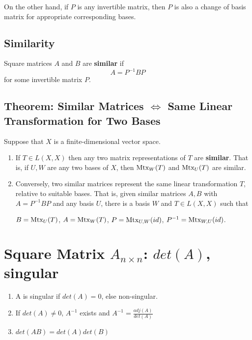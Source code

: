 \documentclass[11pt]{elegantbook}
\begin{document}
On the other hand, if $P$ is any invertible matrix, then $P$ is also a change of basis matrix for appropriate corresponding bases.

\subsection{Similarity}
\begin{definition}[Similar]
    \normalfont
    Square matrices $A$ and $B$ are \textbf{similar} if $$A=P^{-1}BP$$ for some invertible matrix $P$.
\end{definition}


\subsection{Theorem: Similar Matrices $\Leftrightarrow$ Same Linear Transformation for Two Bases}
\begin{theorem}
    Suppose that $X$ is a finite-dimensional vector space.
    \begin{enumerate}
        \item If $T \in L(X, X)$ then any two matrix representations of $T$ are \textbf{similar}. That is, if $U, W$ are any two bases of $X$, then $\textnormal{Mtx}_W(T)$ and $\textnormal{Mtx}_U(T)$ are similar.
        \item Conversely, two similar matrices represent the same linear transformation $T$, relative to suitable bases. That is, given similar matrices $A, B$ with $A = P^{-1}BP$ and any basis $U$, there is a basis $W$ and $T \in L(X, X)$ such that
        \begin{center}
            $B=\textnormal{Mtx}_U(T)$, $A=\textnormal{Mtx}_W(T)$, $P=\textnormal{Mtx}_{U,W}(id)$, $P^{-1}=\textnormal{Mtx}_{W,U}(id)$.
        \end{center}
    \end{enumerate}
\end{theorem}





\section{Square Matrix $A_{n\times n}$: $det(A)$, singular}
\begin{enumerate}
    \item A is singular if $det(A)=0$, else non-singular.
    \item If $det(A)\neq 0$, $A^{-1}$ exists and $A^{-1}=\frac{adj(A)}{det(A)}$
    \item $det(AB)=det(A)det(B)$
\end{enumerate}
\end{document}
